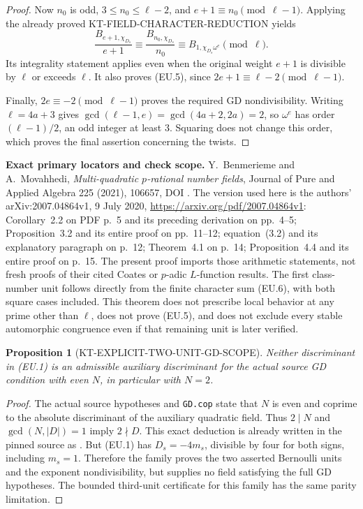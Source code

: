 \documentclass[11pt,a4paper]{article}
\newtheorem{proposition}[theorem]{Proposition}
\theoremstyle{definition}
\renewcommand{\paragraph}[1]{\par\smallskip\noindent\textbf{#1}\quad\ignorespaces}
\begin{document}
\begin{proof}
Now $n_0$ is odd, $3\leq n_0\leq\ell-2$, and
$e+1\equiv n_0\pmod{\ell-1}$.  Applying the already proved
KT-FIELD-CHARACTER-REDUCTION yields
\[
 \frac{B_{e+1,\chi_{D_s}}}{e+1}
 \equiv\frac{B_{n_0,\chi_{D_s}}}{n_0}
 \equiv B_{1,\chi_{D_s}\omega^e}\pmod\ell.                 \tag{EU.9}
\]
Its integrality statement applies even when the original weight
$e+1$ is divisible by $\ell$ or exceeds $\ell$.  It also proves
(EU.5), since $2e+1\equiv\ell-2\pmod{\ell-1}$.

Finally, $2e\equiv-2\pmod{\ell-1}$ proves the required GD
nondivisibility.  Writing $\ell=4a+3$ gives
$\gcd(\ell-1,e)=\gcd(4a+2,2a)=2$, so $\omega^e$ has order
$(\ell-1)/2$, an odd integer at least $3$.  Squaring does not change
this order, which proves the final assertion concerning the twists.
\end{proof}

\paragraph{Exact primary locators and check scope.}
Y.~Benmerieme and A.~Movahhedi, \emph{Multi-quadratic $p$-rational
number fields}, Journal of Pure and Applied Algebra 225 (2021),
106657, DOI .
The version used here is the authors' arXiv:2007.04864v1,
9 July 2020, \url{https://arxiv.org/pdf/2007.04864v1}:
Corollary~2.2 on PDF p.~5 and its preceding derivation on pp.~4--5;
Proposition~3.2 and its entire proof on pp.~11--12;
equation~(3.2) and its explanatory paragraph on p.~12;
Theorem~4.1 on p.~14; Proposition~4.4 and its entire proof on p.~15.
The present proof imports those arithmetic statements, not fresh
proofs of their cited Coates or $p$-adic $L$-function results.
The first class-number unit follows directly from the finite character
sum (EU.6), with both square cases included.
This theorem does not prescribe local behavior at any prime other than
$\ell$, does not prove (EU.5), and does not exclude every stable
automorphic congruence even if that remaining unit is later verified.

\begin{proposition}[KT-EXPLICIT-TWO-UNIT-GD-SCOPE]
Neither discriminant in (EU.1) is an admissible auxiliary discriminant
for the actual source GD condition with even $N$, in particular with
$N=2$.
\end{proposition}
\begin{proof}
The actual source hypotheses  and
\texttt{GD.cop} state that $N$ is even and coprime to the absolute
discriminant of the auxiliary quadratic field.  Thus $2\mid N$
and $\gcd(N,|D|)=1$ imply $2\nmid D$.  This exact deduction is
already written in the pinned source
 as
.
But (EU.1) has $D_s=-4m_s$, divisible by four for both signs,
including $m_s=1$.  Therefore the family proves the two asserted
Bernoulli units and the exponent nondivisibility, but supplies no
field satisfying the full GD hypotheses.  The bounded third-unit
certificate for this family has the same parity limitation.
\end{proof}
\end{document}
